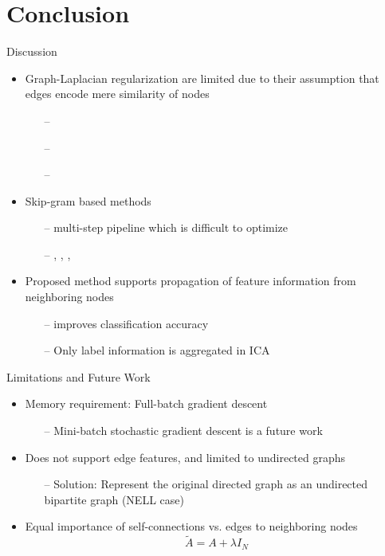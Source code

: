 \documentclass{beamer}
\begin{document}
\section{Conclusion}
\begin{frame}{Discussion}
  \begin{itemize}
  \item Graph-Laplacian regularization are limited due to their assumption
    that edges encode mere similarity of nodes
    \begin{itemize}
    \item[--] \cite{zhu2003semi}
    \item[--] \cite{belkin2006manifold}
    \item[--] \cite{weston2012deep}
    \end{itemize}
  \item Skip-gram based methods
    \begin{itemize}
    \item[--] multi-step pipeline which is difficult to optimize
    \item[--] \cite{mikolov2013distributed}, \cite{perozzi2014deepwalk}, \cite{tang2015line}, \cite{grover2016node2vec}
    \end{itemize}
    \item Proposed method supports propagation of feature information
      from neighboring nodes
      \begin{itemize}
      \item[--] improves classification accuracy
      \item[--] Only label information is aggregated in ICA
      \end{itemize}
  \end{itemize}
\end{frame}
\begin{frame}{Limitations and Future Work}
  \begin{itemize}
  \item Memory requirement: Full-batch gradient descent
    \begin{itemize}
    \item[--] Mini-batch stochastic gradient descent is a future work
    \end{itemize}
  \item Does not support edge features, and limited to undirected graphs
    \begin{itemize}
    \item[--] Solution: Represent the original directed graph as an undirected bipartite graph (NELL case)
    \end{itemize}
  \item Equal importance of self-connections vs. edges to neighboring nodes
    \[
    \tilde{A} = A + \lambda I_N
    \]
  \end{itemize}
\end{frame}
\end{document}
